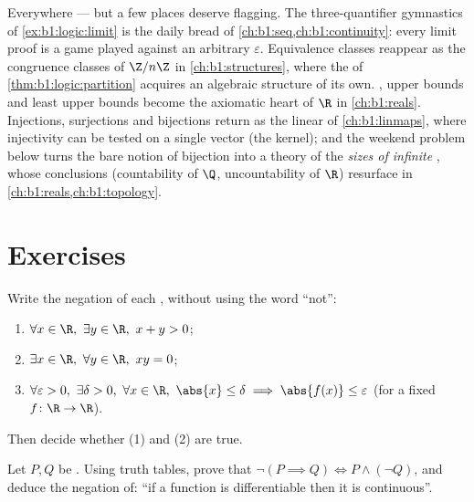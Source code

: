 \begin{remark}\label{rem:b1:logic:whereused}
Everywhere --- but a few places deserve flagging. The three-quantifier
gymnastics of \cref{ex:b1:logic:limit} is the daily bread of
\cref{ch:b1:seq,ch:b1:continuity}: every limit proof is a game played
against an arbitrary $\varepsilon$. Equivalence classes reappear as the
congruence classes of $\Z/n\Z$ in \cref{ch:b1:structures}, where the
 of \cref{thm:b1:logic:partition} acquires an algebraic
structure of its own. , upper bounds and least upper
bounds become the axiomatic heart of $\R$ in \cref{ch:b1:reals}.
Injections, surjections and bijections return as the linear  of
\cref{ch:b1:linmaps}, where injectivity can be tested on a single
vector (the kernel); and the weekend problem below turns the bare
notion of bijection into a theory of the \emph{sizes of infinite
}, whose conclusions (countability of $\Q$, uncountability of
$\R$) resurface in \cref{ch:b1:reals,ch:b1:topology}.
\end{remark}

\section{Exercises}

\begin{exercise}[$\star$]\label{exo:b1:logic:1}
Write the negation of each , without using the word ``not'':
\begin{enumerate}
  \item $\forall x \in \R,\ \exists y \in \R,\ x + y > 0$;
  \item $\exists x \in \R,\ \forall y \in \R,\ xy = 0$;
  \item $\forall \varepsilon > 0,\ \exists \delta > 0,\ \forall x \in
        \R,\ \abs{x} \leq \delta \implies \abs{f(x)} \leq \varepsilon$
        (for a fixed  $f \colon \R \to \R$).
\end{enumerate}
Then decide whether  (1) and (2) are true.
\end{exercise}

\begin{exercise}[$\star$]\label{exo:b1:logic:2}
Let $P, Q$ be . Using truth tables, prove that
$\lnot(P \implies Q) \iff P \land (\lnot Q)$, and deduce the negation
of: ``if a function is differentiable then it is continuous''.
\end{exercise}

